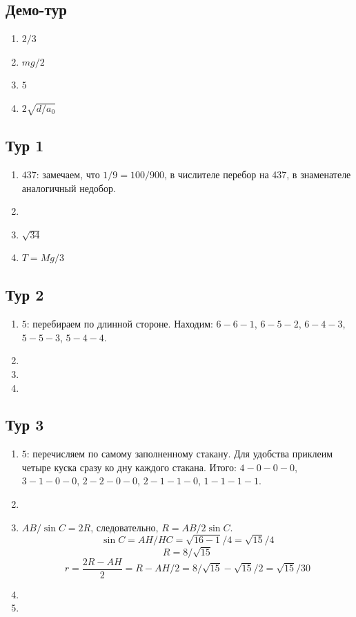 \documentclass[12pt]{article} %
\begin{document}
\subsection*{Демо-тур}

\begin{enumerate}
\item $2/3$
\item $mg/2$
\item $5$
\item $2\sqrt{d/a_0}$
\end{enumerate}

\subsection*{Тур 1}

\begin{enumerate}
\item $437$: замечаем, что $1/9=100/900$, в числителе перебор на 437, в знаменателе аналогичный недобор.
\item 
\item $\sqrt{34}$
\item $T=Mg/3$
\end{enumerate}

\subsection*{Тур 2}

\begin{enumerate}
\item $5$: перебираем по длинной стороне. Находим: $6-6-1$, $6-5-2$, $6-4-3$, $5-5-3$, $5-4-4$.
\item 
\item 
\item 
\end{enumerate}

\subsection*{Тур 3}

\begin{enumerate}
\item $5$: перечисляем по самому заполненному стакану. Для удобства приклеим четыре куска сразу ко дну каждого стакана. 
Итого: $4-0-0-0$, $3-1-0-0$, $2-2-0-0$, $2-1-1-0$, $1-1-1-1$.
\item 
\item $AB/\sin C = 2R$, следовательно, $R= AB/2\sin C$. 
\[
\sin C = AH/HC = \sqrt{16-1}/4=\sqrt{15}/4    
\]
\[
R = 8/\sqrt{15}    
\]
\[
r = \frac{2R - AH}{2} = R - AH/2 = 8/\sqrt{15} - \sqrt{15}/2 = \sqrt{15}/30
\]
\item 
\item 
\end{enumerate}
\end{document}
